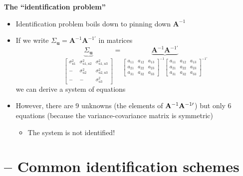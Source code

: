 \documentclass[10pt,handout]{beamer}
\begin{document}
\begin{frame}
{\textbf{The \textquotedblleft identification problem\textquotedblright }}

\begin{itemize}
\item Identification problem boils down to pinning down $\mathbf{A}^{-1}$%
\medskip \pause

\item If we write $\Sigma _{\mathbf{u}}=\mathbf{A}^{-1}\mathbf{A}^{-1\prime }
$ in matrices%
\begin{equation*}
\underset{\left[ 
\begin{array}{ccc}
\sigma _{u1}^{2} & \sigma _{u1,u2}^{2} & \sigma _{u1,u3}^{2} \\ 
- & \sigma _{u2}^{2} & \sigma _{u2,u3}^{2} \\ 
- & - & \sigma _{u3}^{2}%
\end{array}%
\right] }{\underbrace{\Sigma _{\mathbf{u}}}}=\underset{\left[ 
\begin{array}{ccc}
a_{11} & a_{12} & a_{13} \\ 
a_{21} & a_{22} & a_{23} \\ 
a_{31} & a_{32} & a_{33}%
\end{array}%
\right] ^{-1}\left[ 
\begin{array}{ccc}
a_{11} & a_{12} & a_{13} \\ 
a_{21} & a_{22} & a_{23} \\ 
a_{31} & a_{32} & a_{33}%
\end{array}%
\right] ^{-1\prime }}{\underbrace{\mathbf{A}^{-1}\mathbf{A}^{-1\prime }}}
\end{equation*}%
we can derive a system of equations\medskip \pause

\item However, there are 9 unknowns (the elements of $\mathbf{A}^{-1}\mathbf{%
A}^{-1\prime }$) but only 6 equations (because the variance-covariance
matrix is symmetric)

\begin{itemize}
\item {{\color{red} The system is not identified!}}
\end{itemize}
\end{itemize}
\end{frame}

\vspace{.1cm}

\section{ -- Common identification schemes}
\end{document}
